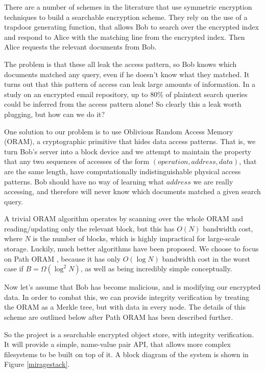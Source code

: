 \documentclass[12pt,a4paper,twoside]{article}
\begin{document}
There are a number of schemes in the literature that use symmetric encryption techniques to build a searchable encryption scheme. They rely on the use of a trapdoor generating function, that allows Bob to search over the encrypted index and respond to Alice with the matching line from the encrypted index. Then Alice requests the relevant documents from Bob.

The problem is that these all leak the access pattern, so Bob knows which documents matched any query, even if he doesn't know what they matched. It turns out that this pattern of access can leak large amounts of information. In a study \cite{islam2012access} on an encrypted email repository, up to 80\% of plaintext search queries could be inferred from the access pattern alone! So clearly this a leak worth plugging, but how can we do it?


One solution to our problem is to use Oblivious Random Access Memory (ORAM), a cryptographic primitive that hides data access patterns. That is, we turn Bob's server into a block device and we attempt to maintain the property that any two sequences of accesses of the form $(operation,address,data)$, that are the same length, have computationally indistinguishable physical access patterns. Bob should have no way of learning what $address$ we are really accessing, and therefore will never know which documents matched a given search query.

A trivial ORAM algorithm operates by scanning over the whole ORAM and reading/updating only the relevant block, but this has $O(N)$ bandwidth cost, where $N$ is the number of blocks, which is highly impractical for large-scale storage. Luckily, much better algorithms have been proposed. We choose to focus on Path ORAM \cite{stefanov2013path}, because it has only $O(\log N)$ bandwidth cost in the worst case if $B = \Omega(\log^2 N)$, as well as being incredibly simple conceptually.


Now let's assume that Bob has become malicious, and is modifying our encrypted data. In order to combat this, we can provide integrity verification by treating the ORAM as a Merkle tree, but with data in every node. The details of this scheme are outlined below after Path ORAM has been described further.

So the project is a searchable encrypted object store, with integrity verification. It will provide a simple, name-value pair API, that allows more complex filesystems to be built on top of it. A block diagram of the system is shown in Figure \ref{miragestack}.
\end{document}

